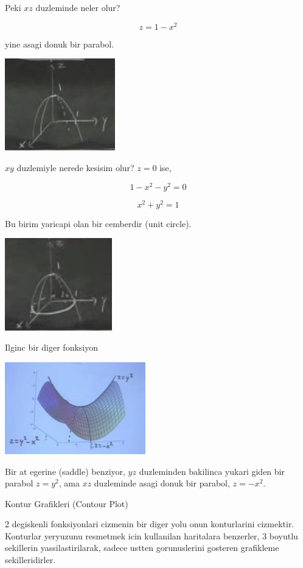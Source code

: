 \documentclass[12pt,fleqn]{article}
\begin{document}
Peki $xz$ duzleminde neler olur?

\[ z = 1- x^2 \]

yine asagi donuk bir parabol. 

\includegraphics[height=4cm]{8_4.png}

$xy$ duzlemiyle nerede kesisim olur? $z=0$ ise, 

\[ 1-x^2-y^2 = 0 \]

\[ x^2 + y^2 = 1 \]

Bu birim yaricapi olan bir cemberdir (unit circle). 

\includegraphics[height=4cm]{8_5.png}

Ilginc bir diger fonksiyon

\includegraphics[height=4cm]{8_6.png}

Bir at egerine (saddle) benziyor, $yz$ duzleminden bakilinca yukari giden
bir parabol $z=y^2$, ama $xz$ duzleminde asagi donuk bir parabol, $z=-x^2$. 

Kontur Grafikleri (Contour Plot)

2 degiskenli fonksiyonlari cizmenin bir diger yolu onun konturlarini
cizmektir. Konturlar yeryuzunu resmetmek icin kullanilan haritalara
benzerler, 3 boyutlu sekillerin yassilastirilarak, sadece ustten
gorunuslerini gosteren grafikleme sekilleridirler. 
\end{document}
